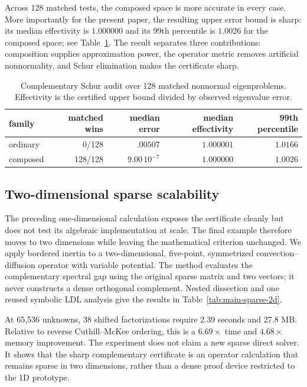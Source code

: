 \documentclass[11pt]{article}
\numberwithin{algorithm}{section}
\theoremstyle{definition}\newtheorem{definition}[theorem]{Definition}
\theoremstyle{remark}\newtheorem{remark}[theorem]{Remark}
\begin{document}
Across 128 matched tests, the composed space is more accurate in every case.
More importantly for the present paper, the resulting upper error bound is
sharp: its median effectivity is $1.000000$ and its 99th percentile is
$1.0026$ for the composed space; see Table~\ref{tab:main-spectrum}.  The result
separates three contributions: composition supplies approximation power, the
operator metric removes artificial nonnormality, and Schur elimination makes
the certificate sharp.

\begin{table}[H]
\centering
\caption{Complementary Schur audit over 128 matched nonnormal eigenproblems.
Effectivity is the certified upper bound divided by observed eigenvalue error.}
\label{tab:main-spectrum}
\begin{tabular}{lrrrr}
\toprule
family & matched wins & median error & median effectivity & 99th percentile\\
\midrule
ordinary & 0/128   & $.00507$ & $1.000001$ & $1.0166$\\
composed & 128/128 & $9.00\,10^{-7}$ & $1.000000$ & $1.0026$\\
\bottomrule
\end{tabular}
\end{table}

\subsection{Two-dimensional sparse scalability}
The preceding one-dimensional calculation exposes the certificate cleanly but
does not test its algebraic implementation at scale.  The final example therefore
moves to two dimensions while leaving the mathematical criterion unchanged. We
apply bordered inertia to a two-dimensional, five-point,
symmetrized convection--diffusion operator with variable potential.  The
method evaluates the complementary spectral gap using the original sparse
matrix and two vectors; it never constructs a dense orthogonal complement.
Nested dissection and one reused symbolic LDL analysis give the results in
Table~\ref{tab:main-sparse-2d}.

At 65,536 unknowns, 38 shifted factorizations require 2.39 seconds and 27.8 MB.
Relative to reverse Cuthill--McKee ordering, this is a $6.69\times$ time and
$4.68\times$ memory improvement.  The experiment does not claim a new sparse
direct solver.  It shows that the sharp complementary certificate is an
operator calculation that remains sparse in two dimensions, rather than a
dense proof device restricted to the 1D prototype.
\end{document}
